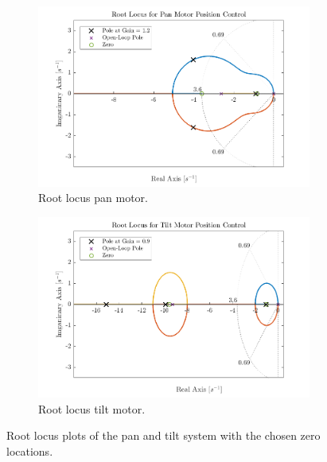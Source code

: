 \documentclass[../../main.tex]{subfiles}
\begin{document}
\begin{figure}[h]
\begin{subfigure}{0.49\textwidth}
    \includegraphics[width = 0.99\textwidth]{Sections/System_Design/Images/RL_PanMotorPos2.png}
    \caption{Root locus pan motor.}
    \label{fig:PosRootLocusPan}
\end{subfigure}\quad
\begin{subfigure}{0.49\textwidth}
    \includegraphics[width = 0.99\textwidth]{Sections/System_Design/Images/RL_TiltMotorPos.png}
    \caption{Root locus tilt motor.}
    \label{fig:PosRootLocusTilt}
\end{subfigure}
\caption{Root locus plots of the pan and tilt system with the chosen zero locations.}
\label{fig:PosRootLocus}
\end{figure}
\end{document}
